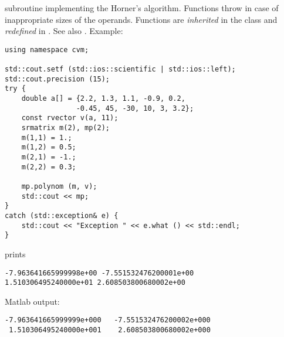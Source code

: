 \FORTRAN subroutine implementing the Horner's algorithm.
Functions throw   
in case of inappropriate sizes of the operands.
Functions are \emph{inherited} in the class
and \emph{redefined} in .
See also
.
Example:
\begin{Verbatim}
using namespace cvm;

std::cout.setf (std::ios::scientific | std::ios::left); 
std::cout.precision (15);
try {
    double a[] = {2.2, 1.3, 1.1, -0.9, 0.2,
                 -0.45, 45, -30, 10, 3, 3.2};
    const rvector v(a, 11);
    srmatrix m(2), mp(2);
    m(1,1) = 1.;
    m(1,2) = 0.5;
    m(2,1) = -1.;
    m(2,2) = 0.3;

    mp.polynom (m, v);
    std::cout << mp;
}
catch (std::exception& e) {
    std::cout << "Exception " << e.what () << std::endl;
}
\end{Verbatim}
prints
\begin{Verbatim}
-7.963641665999998e+00 -7.551532476200001e+00
1.510306495240000e+01 2.608503800680002e+00
\end{Verbatim}
Matlab output:
\begin{Verbatim}
-7.963641665999999e+000   -7.551532476200002e+000
 1.510306495240000e+001    2.608503800680002e+000
\end{Verbatim}
\newpage







